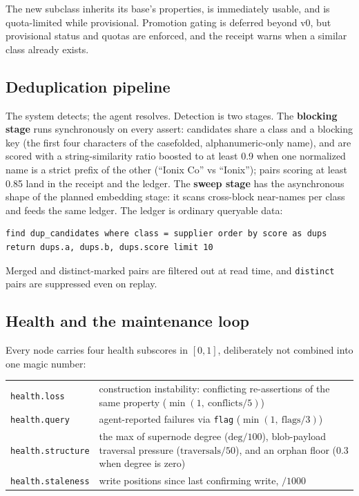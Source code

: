 \documentclass[11pt]{article}
\begin{document}
The new subclass inherits its base's properties, is immediately usable, and is quota-limited while provisional. Promotion gating is deferred beyond v0, but provisional status and quotas are enforced, and the receipt warns when a similar class already exists.

\subsection{Deduplication pipeline}

The system detects; the agent resolves. Detection is two stages. The \textbf{blocking stage} runs synchronously on every assert: candidates share a class and a blocking key (the first four characters of the casefolded, alphanumeric-only name), and are scored with a string-similarity ratio boosted to at least 0.9 when one normalized name is a strict prefix of the other (``Ionix Co'' vs ``Ionix''); pairs scoring at least 0.85 land in the receipt and the ledger. The \textbf{sweep stage} has the asynchronous shape of the planned embedding stage: it scans cross-block near-names per class and feeds the same ledger. The ledger is ordinary queryable data:

\begin{lstlisting}[style=gl]
find dup_candidates where class = supplier order by score as dups
return dups.a, dups.b, dups.score limit 10
\end{lstlisting}

Merged and distinct-marked pairs are filtered out at read time, and \texttt{distinct} pairs are suppressed even on replay.

\subsection{Health and the maintenance loop}

Every node carries four health subscores in $[0,1]$, deliberately not combined into one magic number:

\begin{center}
\small
\begin{tabular}{lp{9.2cm}}
\toprule
\texttt{health.loss} & construction instability: conflicting re-assertions of the same property (\(\min(1,\ \mathrm{conflicts}/5)\)) \\
\texttt{health.query} & agent-reported failures via \texttt{flag} (\(\min(1,\ \mathrm{flags}/3)\)) \\
\texttt{health.structure} & the max of supernode degree (\(\mathrm{deg}/100\)), blob-payload traversal pressure (\(\mathrm{traversals}/50\)), and an orphan floor (0.3 when degree is zero) \\
\texttt{health.staleness} & write positions since last confirming write, \(/1000\) \\
\bottomrule
\end{tabular}
\end{center}
\end{document}
